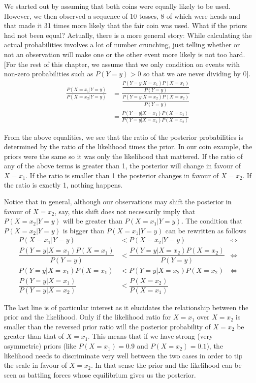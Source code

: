 We started out by assuming that both coins were equally likely to be used. However, we then observed a sequence of 10 tosses, 8 of 
which were heads and that made it 31 times more likely that the fair coin was used. What if the priors had not been equal?
Actually, there is a more general story: While calculating the actual probabilities involves a lot of number crunching, just telling whether or not an observation will make one or the other event more likely is not too hard. [For the rest of this chapter, we assume that we only condition on events with non-zero probabilities such as $P(Y=y)>0$ so that we are never dividing by 0].
\begin{align*}
\frac{P(X=x_{1}|Y=y)}{P(X=x_{2}|Y=y)} &= \frac{\dfrac{P(Y=y|X=x_{1})P(X=x_{1})}{P(Y=y)}}{\dfrac{P(Y=y|X=x_{2})P(X=x_{2})}{P(Y=y)}} \\[1em]
&= \frac{P(Y=y|X=x_{1})P(X=x_{1})}{P(Y=y|X=x_{2})P(X=x_{2})}
\end{align*}

From the above equalities, we see that the ratio of the posterior probabilities is determined by the ratio of the likelihood times the
prior. In our coin example, the priors were the same so it was only the likelihood that mattered. If the ratio of any of the above
terms is greater than 1, the posterior will change in favour of $ X=x_{1} $. If the ratio is smaller than 1 the posterior changes
in favour of $ X=x_{2} $. If the ratio is exactly 1, nothing happens. 

Notice that in general, although our observations may shift the posterior in favour of $ X=x_{2} $, say, this shift does not necessarily imply that 
$ P(X=x_{2}|Y=y) $ will be greater than $ P(X=x_{1}|Y=y) $. The condition that $ P(X=x_{2}|Y=y) $ is bigger than  $ P(X=x_{1}|Y=y) $ can be rewritten as follows
\begin{align*}
P(X=x_{1}|Y=y) &< P(X=x_{2}|Y=y)  &\Leftrightarrow \\
\dfrac{P(Y=y|X=x_{1})P(X=x_{1})}{P(Y=y)} &< \dfrac{P(Y=y|X=x_{2})P(X=x_{2})}{P(Y=y)} &\Leftrightarrow \\
P(Y=y|X=x_{1})P(X=x_{1}) &< P(Y=y|X=x_{2})P(X=x_{2}) &\Leftrightarrow \\
\dfrac{P(Y=y|X=x_{1})}{P(Y=y|X=x_{2})} &< \dfrac{P(X=x_{2})}{P(X=x_{1})}
\end{align*} 

The last line is of particular interest as it elucidates the relationship between the prior and the likelihood. Only if the likelihood
ratio for $ X=x_{1} $ over $ X=x_{2} $ is smaller than the reversed prior ratio will the posterior probability of $ X=x_{2} $
be greater than that of $ X=x_{1} $. This means that if we have strong (very asymmetric) priors (like $ P(X=x_{1}) = 0.9 $
and $ P(X=x_{2}) = 0.1 $), the likelihood needs to discriminate very well between the two cases in order to tip the scale in
favour of $ X=x_{2} $. In that sense the prior and the likelihood can be seen as battling forces whose equilibrium gives us 
the posterior.

